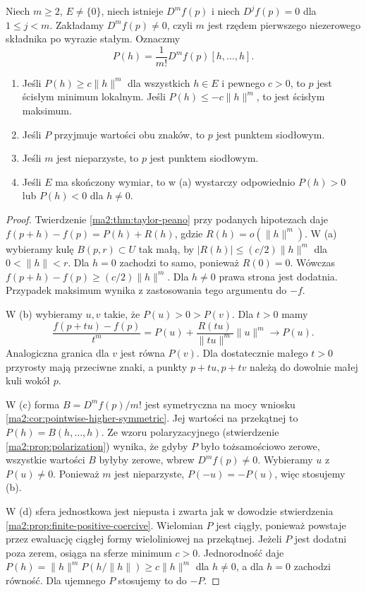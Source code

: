 \begin{twierdzenie}
\label{ma2:thm:higher-extremum}
Niech $m\ge2$, $E\ne\{0\}$, niech istnieje $D^mf(p)$
i niech $D^jf(p)=0$ dla $1\le j<m$.
Zakładamy $D^mf(p)\ne0$, czyli $m$ jest rzędem
pierwszego niezerowego składnika po wyrazie stałym.
Oznaczmy
\[
 P(h)=\frac{1}{m!}D^mf(p)[h,\ldots,h].
\]
\begin{enumerate}[label=(\alph*)]
\item Jeśli $P(h)\ge c\|h\|^m$ dla wszystkich $h\in E$
i pewnego $c>0$, to $p$ jest ścisłym minimum lokalnym.
Jeśli $P(h)\le-c\|h\|^m$, to jest ścisłym maksimum.
\item Jeśli $P$ przyjmuje wartości obu znaków, to $p$
jest punktem siodłowym.
\item Jeśli $m$ jest nieparzyste, to $p$ jest punktem siodłowym.
\item Jeśli $E$ ma skończony wymiar, to w (a)
wystarczy odpowiednio $P(h)>0$ lub $P(h)<0$ dla $h\ne0$.
\end{enumerate}
\end{twierdzenie}
\begin{proof}
Twierdzenie \ref{ma2:thm:taylor-peano} przy podanych
hipotezach daje
$f(p+h)-f(p)=P(h)+R(h)$, gdzie $R(h)=o(\|h\|^m)$.
W (a) wybieramy kulę $B(p,r)\subset U$ tak małą,
by $|R(h)|\le(c/2)\|h\|^m$ dla $0<\|h\|<r$.
Dla $h=0$ zachodzi to samo, ponieważ $R(0)=0$.
Wówczas $f(p+h)-f(p)\ge(c/2)\|h\|^m$.
Dla $h\ne0$ prawa strona jest dodatnia.
Przypadek maksimum wynika z zastosowania tego
argumentu do $-f$.

W (b) wybieramy $u,v$ takie, że $P(u)>0>P(v)$.
Dla $t>0$ mamy
\[
 \frac{f(p+tu)-f(p)}{t^m}
 =P(u)+\frac{R(tu)}{\|tu\|^m}\|u\|^m\longrightarrow P(u).
\]
Analogiczna granica dla $v$ jest równa $P(v)$.
Dla dostatecznie małego $t>0$ przyrosty mają przeciwne
znaki, a punkty $p+tu,p+tv$ należą do dowolnie małej
kuli wokół $p$.

W (c) forma $B=D^mf(p)/m!$ jest symetryczna na mocy
wniosku \ref{ma2:cor:pointwise-higher-symmetric}.
Jej wartości na przekątnej to $P(h)=B(h,\ldots,h)$.
Ze wzoru polaryzacyjnego (stwierdzenie
\ref{ma2:prop:polarization}) wynika, że gdyby $P$ było
tożsamościowo zerowe, wszystkie wartości $B$ byłyby
zerowe, wbrew $D^mf(p)\ne0$.
Wybieramy $u$ z $P(u)\ne0$. Ponieważ $m$ jest
nieparzyste, $P(-u)=-P(u)$, więc stosujemy (b).

W (d) sfera jednostkowa jest niepusta i zwarta jak
w dowodzie stwierdzenia \ref{ma2:prop:finite-positive-coercive}.
Wielomian $P$ jest ciągły, ponieważ powstaje przez
ewaluację ciągłej formy wieloliniowej na przekątnej.
Jeżeli $P$ jest dodatni poza zerem, osiąga na sferze
minimum $c>0$. Jednorodność daje
$P(h)=\|h\|^mP(h/\|h\|)\ge c\|h\|^m$ dla $h\ne0$,
a dla $h=0$ zachodzi równość. Dla ujemnego $P$
stosujemy to do $-P$.
\end{proof}

